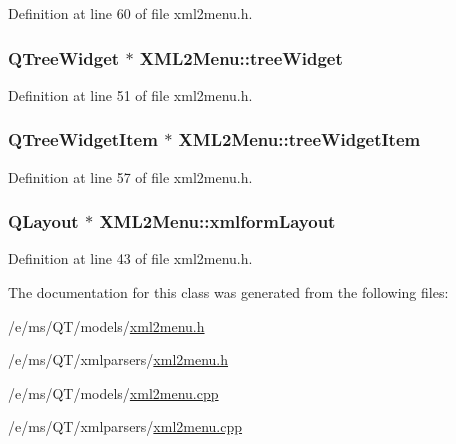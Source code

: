 Definition at line 60 of file xml2menu.h.

\hypertarget{classXML2Menu_ad45f71995bccb3f741be0e66e53b853d}{
\subsubsection[{treeWidget}]{\setlength{\rightskip}{0pt plus 5cm}QTreeWidget $\ast$ {\bf XML2Menu::treeWidget}}}
\label{classXML2Menu_ad45f71995bccb3f741be0e66e53b853d}


Definition at line 51 of file xml2menu.h.

\hypertarget{classXML2Menu_a13cea0b23ecf22219630e4f790b3100d}{
\subsubsection[{treeWidgetItem}]{\setlength{\rightskip}{0pt plus 5cm}QTreeWidgetItem $\ast$ {\bf XML2Menu::treeWidgetItem}}}
\label{classXML2Menu_a13cea0b23ecf22219630e4f790b3100d}


Definition at line 57 of file xml2menu.h.

\hypertarget{classXML2Menu_a17579d47fd587b9f197bd8c8fc41e454}{
\subsubsection[{xmlformLayout}]{\setlength{\rightskip}{0pt plus 5cm}QLayout $\ast$ {\bf XML2Menu::xmlformLayout}}}
\label{classXML2Menu_a17579d47fd587b9f197bd8c8fc41e454}


Definition at line 43 of file xml2menu.h.



The documentation for this class was generated from the following files:\begin{DoxyCompactItemize}
\item 
/e/ms/QT/models/\hyperlink{models_2xml2menu_8h}{xml2menu.h}\item 
/e/ms/QT/xmlparsers/\hyperlink{xmlparsers_2xml2menu_8h}{xml2menu.h}\item 
/e/ms/QT/models/\hyperlink{models_2xml2menu_8cpp}{xml2menu.cpp}\item 
/e/ms/QT/xmlparsers/\hyperlink{xmlparsers_2xml2menu_8cpp}{xml2menu.cpp}\end{DoxyCompactItemize}
